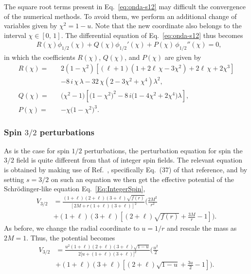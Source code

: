 The square root terms present in Eq.~\eqref{eq:onda-s12} may difficult the convergence of the numerical methods. To avoid them, we perform an additional change of variables given by $\chi^2=1-u$. Note that the new coordinate also belongs to the interval $\chi \in [0,\,1]$. The differential equation of Eq.~\eqref{eq:onda-s12} thus becomes
%
\begin{equation}\label{eq:onda-s12a}
  \begin{split}
    &R(\chi)\phi_{\scriptscriptstyle{1/2}}(\chi) + Q(\chi)\phi_{\scriptscriptstyle{1/2}}'(\chi) + P(\chi) \,\phi_{\scriptscriptstyle{1/2}}''(\chi)=0,
  \end{split}
\end{equation}
%
in which the coefficients $R(\chi)$, $Q(\chi)$, and $P(\chi)$ are given by
%
\begin{eqnarray}
  R(\chi)=
  \,&&2(1-\chi^2)\left[\left(\ell+1\right) \left(1+ 2\ell\,\chi-3\chi^2\right) + 2\ell\, \chi +2\chi^3\right] \nonumber \\
  && - 8\,i\,\chi \,\lambda-32\,\chi\left(2-3\chi^2+\chi^4\right)\lambda^2,\\
  Q(\chi) = && (\chi^2-1\big)\left[\big(1-\chi^2\big)^2-8\,i\big(1-4\chi^2+2\chi^4\big)\lambda\right],\\
  P(\chi)  =&& -\chi\big(1-\chi^2\big)^3.
\end{eqnarray}

\subsubsection{Spin $3/2$ perturbations}

As is the case for spin $1/2$ perturbations, the perturbation equation for spin the $3/2$ field is quite different from that of integer spin fields. The relevant equation is obtained by making use of Ref.~\cite{Shu:2005fw}, specifically Eq.~(37) of that reference, and by setting $s=3/2$ on such an equation we then get the effective potential of the Schr\"odinger-like equation Eq.~\eqref{Eq:IntegerSpin},
%
\begin{equation} \begin{split}
    V_{\scriptscriptstyle{3/2}} &=\frac{(1+\ell)(2+\ell)(3+\ell)\sqrt{f(r)}}{\left[2M+r(1+\ell)(3+\ell)\right]^2} \bigg(\frac{2M^2}{r^2}\\ &+(1+\ell)(3+\ell)\left[(2+\ell)\sqrt{f(r)}+\frac{3M}{r}-1\right]\bigg).
  \end{split}
\end{equation}
%
As before, we change the radial coordinate to $u=1/r$ and rescale the mass as $2M=1$. Thus, the potential becomes
%
\begin{equation}\begin{split}
    V_{\scriptscriptstyle{3/2}}&=\frac{u^2(1+\ell)(2+\ell)(3+\ell)\sqrt{1-u}}{2\big[u+(1+\ell)(3+\ell)\big]^2} \bigg(\frac{u^2}{2}\\ &+(1+\ell)(3+\ell)\left[(2+\ell)\sqrt{1-u}+\frac{3u}{2}-1\right]\bigg).
  \end{split}
\end{equation}

